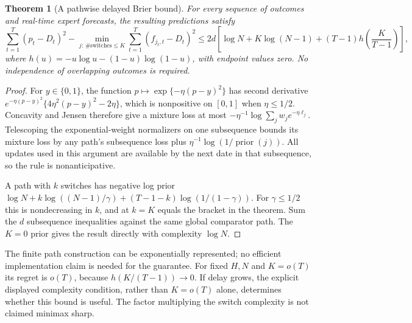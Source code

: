 \documentclass[11pt]{article}
\newtheorem{theorem}{Theorem}
\theoremstyle{remark}
\begin{document}
\begin{theorem}[A pathwise delayed Brier bound]
For every sequence of outcomes and real-time expert forecasts, the resulting predictions satisfy
\[
 \sum_{t=1}^T(p_t-D_t)^2-
 \min_{j:\,\#\text{switches}\le K}\sum_{t=1}^T(f_{j_t,t}-D_t)^2
 \le2d\left[\log N+K\log(N-1)+(T-1)h\left(\frac K{T-1}\right)\right],
\]
where $h(u)=-u\log u-(1-u)\log(1-u)$, with endpoint values zero. No independence of overlapping outcomes is required.
\end{theorem}
\begin{proof}
For $y\in\{0,1\}$, the function $p\mapsto\exp\{-\eta(p-y)^2\}$ has second derivative
$e^{-\eta(p-y)^2}\{4\eta^2(p-y)^2-2\eta\}$, which is nonpositive on $[0,1]$ when $\eta\le1/2$. Concavity and Jensen therefore give a mixture loss at most
$-\eta^{-1}\log\sum_jw_j e^{-\eta\ell_j}$.
Telescoping the exponential-weight normalizers on one subsequence bounds its mixture loss by any path's subsequence loss plus $\eta^{-1}\log(1/\operatorname{prior}(j))$. All updates used in this argument are available by the next date in that subsequence, so the rule is nonanticipative.

A path with $k$ switches has negative log prior
$\log N+k\log((N-1)/\gamma)+(T-1-k)\log(1/(1-\gamma))$.
For $\gamma\le1/2$ this is nondecreasing in $k$, and at $k=K$ equals the bracket in the theorem. Sum the $d$ subsequence inequalities against the same global comparator path. The $K=0$ prior gives the result directly with complexity $\log N$.
\end{proof}
The finite path construction can be exponentially represented; no efficient implementation claim is needed for the guarantee. For fixed $H,N$ and $K=o(T)$ its regret is $o(T)$, because $h(K/(T-1))\to0$. If delay grows, the explicit displayed complexity condition, rather than $K=o(T)$ alone, determines whether this bound is useful. The factor multiplying the switch complexity is not claimed minimax sharp.
\end{document}
